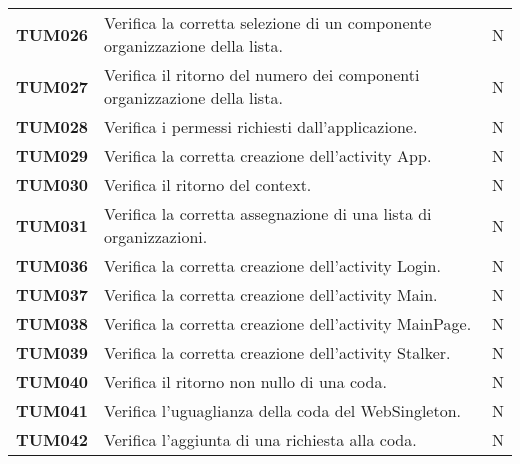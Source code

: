 \documentclass[../../piano-di-qualifica.tex]{subfiles}
\begin{document}
\begin{longtable}[H]{>{\centering\bfseries}m{3cm} >{}m{10cm} >{\centering\arraybackslash}m{3cm}}
  TUM026             & Verifica la corretta selezione di un componente organizzazione della lista. & N\\ %

  TUM027             & Verifica il ritorno del numero dei componenti organizzazione della lista. & N\\ %

  TUM028             & Verifica i permessi richiesti dall'applicazione. & N\\ %



  TUM029             & Verifica la corretta creazione dell'activity App. & N\\ %

  TUM030             & Verifica il ritorno del context. & N\\ %

  TUM031             & Verifica la corretta assegnazione di una lista di organizzazioni. & N\\ %


  TUM036             & Verifica la corretta creazione dell'activity Login. & N\\ %

  TUM037             & Verifica la corretta creazione dell'activity Main. & N\\ %

  TUM038             & Verifica la corretta creazione dell'activity MainPage. & N\\ %

  TUM039             & Verifica la corretta creazione dell'activity Stalker. & N\\ %

  TUM040             & Verifica il ritorno non nullo di una coda. & N\\ %

  TUM041             & Verifica l'uguaglianza della coda del WebSingleton. & N\\ %

  TUM042             & Verifica l'aggiunta di una richiesta alla coda. & N\\ %


\end{longtable}
\end{document}
